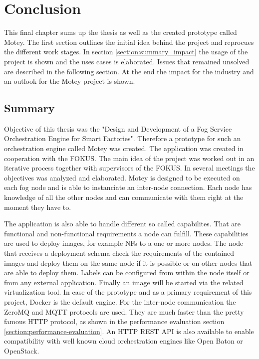 \chapter{Conclusion}
\label{chapter:conclusion}
\minitoc\vspace{.5cm}
This final chapter sums up the thesis as well as the created prototype called Motey.
The first section outlines the initial idea behind the project and reprocues the different work stages.
In section \ref{section:summary_impact} the usage of the project is shown and the uses cases is elaborated.
Issues that remained unsolved are described in the following section.
At the end the impact for the industry and an outlook for the Motey project is shown.

\section{Summary}
Objective of this thesis was the "Design and Development of a Fog Service Orchestration Engine for Smart Factories".
Therefore a prototype for such an orchestration engine called Motey was created.
The application was created in cooperation with the \acf{FOKUS}.
The main idea of the project was worked out in an iterative process together with supervisors of the \ac{FOKUS}.
In several meetings the objectives was analyzed and elaborated.
Motey is designed to be executed on each fog node and is able to instanciate an inter-node connection.
Each node has knowledge of all the other nodes and can communicate with them right at the moment they have to.\newline

The application is also able to handle different so called capabilites.
That are functional and non-functional requirements a node can fulfill.
These capabilities are used to deploy images, for example \acp{NF} to a one or more nodes.
The node that receives a deployment schema check the requirements of the contained images and deploy them on the same node if it is possible or on other nodes that are able to deploy them.
Labels can be configured from within the node itself or from any external application.
Finally an image will be started via the related virtualization tool.
In case of the prototype and as a primary requirement of this project, Docker is the default engine.
For the inter-node communication the ZeroMQ and \ac{MQTT} protocols are used.
They are much faster than the pretty famous \ac{HTTP} protocol, as shown in the performance evaluation section \ref{section:performance-evaluation}.
An \ac{HTTP} \ac{REST} \ac{API} is also available to enable compatibility with well known cloud orchestration engines like Open Baton or OpenStack.

